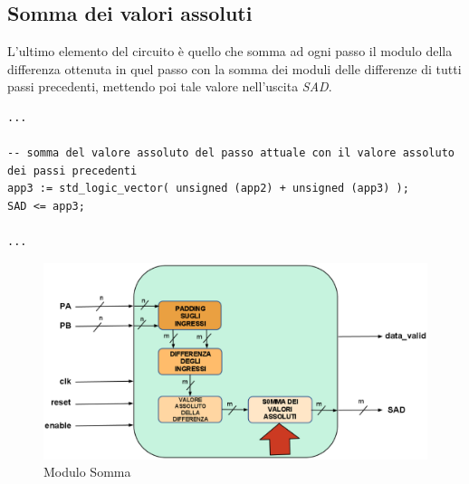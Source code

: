 \documentclass[12pt, a4paper]{article}
\begin{document}
\subsection{Somma dei valori assoluti}
L'ultimo elemento del circuito è quello che somma ad ogni passo il modulo della differenza ottenuta in quel passo con la somma dei moduli delle differenze di tutti passi precedenti, mettendo poi tale valore nell'uscita \textit{SAD}.
{\fontsize{8}{8}
\begin{verbatim}
...

-- somma del valore assoluto del passo attuale con il valore assoluto dei passi precedenti
app3 := std_logic_vector( unsigned (app2) + unsigned (app3) );
SAD <= app3;

...
\end{verbatim}
}
\begin{figure}[h!]
\centering
\includegraphics[scale=0.3]{images/somma.eps}
\caption{Modulo Somma}\label{fig:7}
\end{figure}
\newpage
\end{document}
